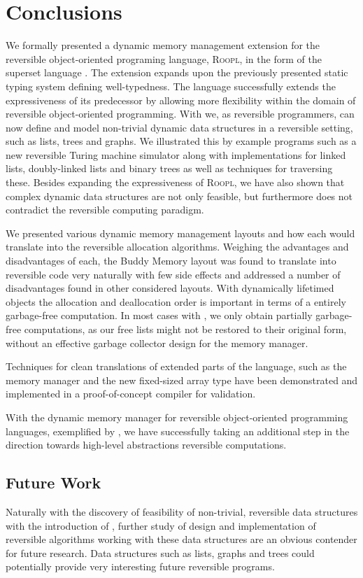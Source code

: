 \chapter{Conclusions}
\label{chp:conclusions}
We formally presented a dynamic memory management extension for the reversible object-oriented programing language, \textsc{Roopl}, in the form of the superset language \rooplpp. The extension expands upon the previously presented static typing system defining well-typedness. The language successfully extends the expressiveness of its predecessor by allowing more flexibility within the domain of reversible object-oriented programming. With \rooplpp we, as reversible programmers, can now define and model non-trivial dynamic data structures in a reversible setting, such as lists, trees and graphs. We illustrated this by example programs such as a new reversible Turing machine simulator along with implementations for linked lists, doubly-linked lists and binary trees as well as techniques for traversing these. Besides expanding the expressiveness of \textsc{Roopl}, we have also shown that complex dynamic data structures are not only feasible, but furthermore does not contradict the reversible computing paradigm.

We presented various dynamic memory management layouts and how each would translate into the reversible allocation algorithms. Weighing the advantages and disadvantages of each, the Buddy Memory layout was found to translate into reversible code very naturally with few side effects and addressed a number of disadvantages found in other considered layouts. With dynamically lifetimed objects the allocation and deallocation order is important in terms of a entirely garbage-free computation. In most cases with \rooplpp, we only obtain partially garbage-free computations, as our free lists might not be restored to their original form, without an effective garbage collector design for the memory manager.

Techniques for clean translations of extended parts of the language, such as the memory manager and the new fixed-sized array type have been demonstrated and implemented in a proof-of-concept compiler for validation.

With the dynamic memory manager for reversible object-oriented programming languages, exemplified by \rooplpp, we have successfully taking an additional step in the direction towards high-level abstractions reversible computations.  

\section{Future Work}
\label{sec:future-work}
Naturally with the discovery of feasibility of non-trivial, reversible data structures with the introduction of \rooplpp, further study of design and implementation of reversible algorithms working with these data structures are an obvious contender for future research. Data structures such as lists, graphs and trees could potentially provide very interesting future reversible programs.

